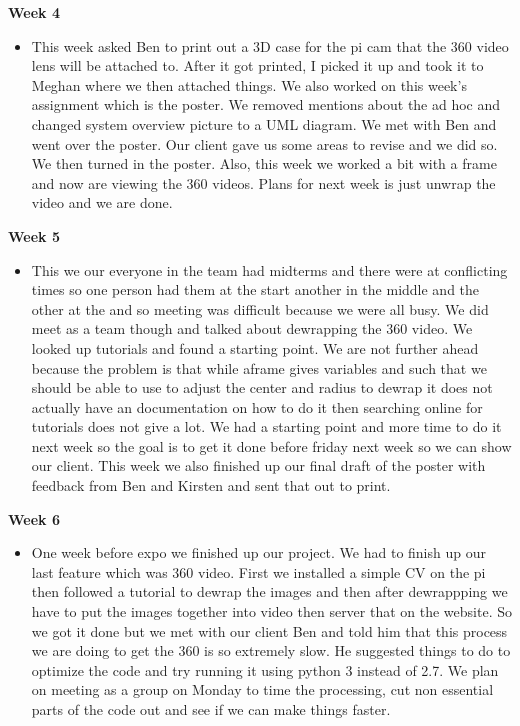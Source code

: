             \textbf{Week 4}
            \begin{itemize}
                \item This week asked Ben to print out a 3D case for the pi cam that the 360 video lens will be attached to. After it got printed, I picked it up and took it to Meghan where we then attached things. We also worked on this week’s assignment which is the poster. We removed mentions about the ad hoc and changed system overview picture to a UML diagram. We met with Ben and went over the poster. Our client gave us some areas to revise and we did so. We then turned in the poster. Also, this week we worked a bit with a frame and now are viewing the 360 videos. Plans for next week is just unwrap the video and we are done.  
            \end{itemize}
            \newpage
            \textbf{Week 5}
            \begin{itemize}
                \item This we our everyone in the team had midterms and there were at conflicting times so one person had them at the start another in the middle and the other at the and so meeting was difficult because we were all busy. We did meet as a team though and talked about dewrapping the 360 video. We looked up tutorials and found a starting point. We are not further ahead because the problem is that while aframe gives variables and such that we should be able to use to adjust the center and radius to dewrap it does not actually have an documentation on how to do it then searching online for tutorials does not give a lot. We had a starting point and more time to do it next week so the goal is to get it done before friday next week so we can show our client. This week we also finished up our final draft of the poster with feedback from Ben and Kirsten and sent that out to print.
            \end{itemize}
            
           \textbf{Week 6}
            \begin{itemize}
                \item One week before expo we finished up our project. We had to finish up our last feature which was 360 video. First we installed a simple CV on the pi then followed a tutorial to dewrap the images and then after dewrappping we have to put the images together into video then server that on the website. So we got it done but we met with our client Ben and told him that this process we are doing to get the 360 is so extremely slow. He suggested things to do to optimize the code and try running it using python 3 instead of 2.7. We plan on meeting as a group on Monday to time the processing, cut non essential parts of the code out and see if we can make things faster.

            \end{itemize}